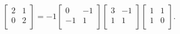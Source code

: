 \documentclass{report}
\begin{document}
{\[\begin{bmatrix}
    2 & 1\\
    0 & 2\\
    \end{bmatrix}= -1 \begin{bmatrix}
    0 & -1\\
    -1 & 1\\
    \end{bmatrix} \begin{bmatrix}
    3 & -1\\
    1 & 1\\
    \end{bmatrix} \begin{bmatrix}
    1 & 1\\
    1 & 0\\
    \end{bmatrix}
    .\] 

 }
 
\end{document}
